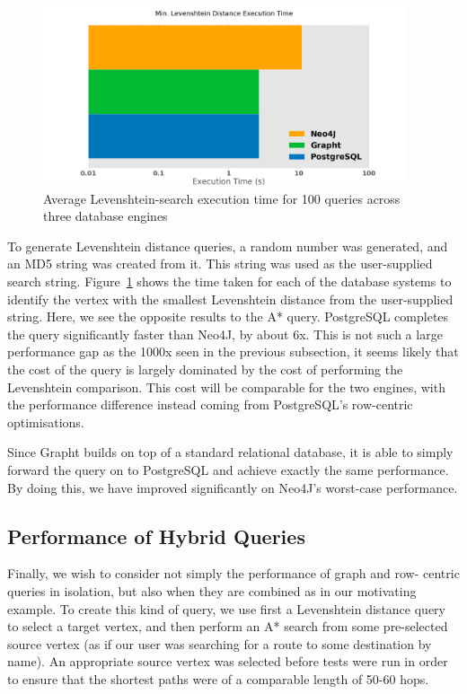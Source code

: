 \begin{figure}[htbp]
	\centering
	\includegraphics[width=0.95\textwidth]{figs/levengraph.eps}
	\caption{Average Levenshtein-search execution time for 100 queries across three database engines}
	\label{fig:levengraph}
\end{figure}

To generate Levenshtein distance queries, a random number was generated, and
an MD5 string was created from it. This string  was used as the user-supplied
search string. Figure~\ref{fig:levengraph} shows  the time taken for each of
the database systems to identify the vertex with the smallest Levenshtein
distance from the user-supplied string. Here, we see the opposite results to
the A* query. PostgreSQL completes the query significantly faster than Neo4J,
by about 6x. This is not such a large performance gap as the 1000x seen in the
previous subsection, it seems likely that the cost of the query is largely
dominated by the cost of performing the Levenshtein comparison. This cost will
be comparable for the two engines, with the performance difference instead coming
from PostgreSQL's row-centric optimisations.

Since Grapht builds on top of a standard relational database, it is able to
simply forward the query on to PostgreSQL and achieve exactly the same
performance. By doing this, we have improved significantly on Neo4J's worst-case
performance.


\subsection{Performance of Hybrid Queries} %
\label{sub:performance_of_hybrid_queries}

Finally, we wish to consider not simply the performance of graph and row-
centric queries in isolation, but also when they are combined as in our
motivating example. To create this kind of query, we use first a Levenshtein
distance query to select a target vertex, and then perform an A* search from
some pre-selected source vertex (as if our user was searching for a route to
some destination by name). An appropriate source vertex was selected before
tests were run in order to ensure that the shortest paths were of a comparable
length of 50-60 hops.

